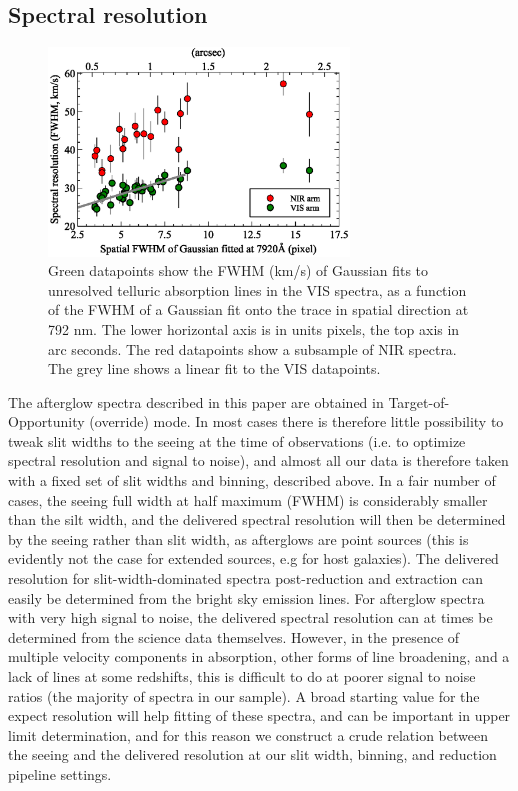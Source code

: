 \documentclass{aa}    %
\begin{document}
\subsection{Spectral resolution} \label{resolution}


\begin{figure}[!ht]
	\centerline{\includegraphics[width=8cm]{figures/resolution_paper.eps}}
	\caption{Green datapoints show the FWHM (km/s) of Gaussian fits to unresolved telluric absorption lines in the VIS spectra, as a function of the FWHM of a Gaussian fit onto the trace in spatial direction at  792 nm. The lower horizontal axis is in units pixels, the top axis in arc seconds. The red datapoints show a subsample of NIR spectra.
		The grey line shows a linear fit to the VIS datapoints. }
	\label{fig:res}
\end{figure}


The afterglow spectra described in this paper are obtained in
Target-of-Opportunity (override) mode. In most cases there is therefore little
possibility to tweak slit widths to the seeing at the time of observations (i.e.
to optimize spectral resolution and signal to noise), and almost all our data is
therefore taken with a fixed set of slit widths and binning, described above. In
a fair number of cases, the seeing full width at half maximum (FWHM) is
considerably smaller than the silt width, and the delivered spectral resolution
will then be determined by the seeing rather than slit width, as afterglows are
point sources (this is evidently not the case for extended sources, e.g for host
galaxies). The delivered resolution for slit-width-dominated spectra
post-reduction and extraction can easily be determined from the bright sky
emission lines. For afterglow spectra with very high signal to noise, the
delivered spectral resolution can at times be determined from the science data
themselves. However, in the presence of multiple velocity components in
absorption, other forms of line broadening, and a lack of lines at some
redshifts, this is difficult to do at poorer signal to noise ratios (the
majority of spectra in our sample). A broad starting value for the expect
resolution will help fitting of these spectra, and can be important in upper
limit determination, and for this reason we construct a crude relation between
the seeing and the delivered resolution at our slit width, binning, and
reduction pipeline settings. 
\end{document}
